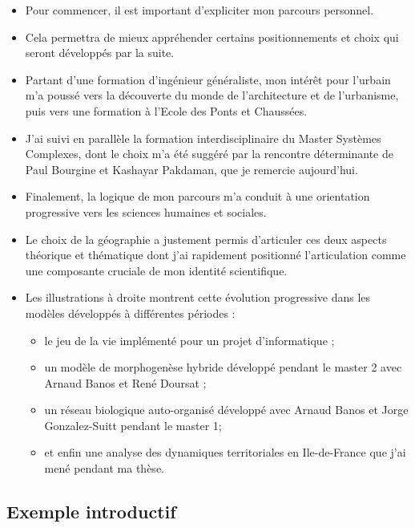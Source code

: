 \documentclass[12pt]{article}
\begin{document}
\begin{itemize}
	\item Pour commencer, il est important d'expliciter mon parcours personnel.
	\item Cela permettra de mieux appréhender certains positionnements et choix qui seront développés par la suite.
	\item Partant d'une formation d'ingénieur généraliste, mon intérêt pour l'urbain m'a poussé vers la découverte du monde de l'architecture et de l'urbanisme, puis vers une formation à l'Ecole des Ponts et Chaussées.
	\item J'ai suivi en parallèle la formation interdisciplinaire du Master Systèmes Complexes, dont le choix m'a été suggéré par la rencontre déterminante de Paul Bourgine et Kashayar Pakdaman, que je remercie aujourd'hui.
	\item Finalement, la logique de mon parcours m'a conduit à une orientation progressive vers les sciences humaines et sociales.
	\item Le choix de la géographie a justement permis d'articuler ces deux aspects théorique et thématique dont j'ai rapidement positionné l'articulation comme une composante cruciale de mon identité scientifique.
	\item Les illustrations à droite montrent cette évolution progressive dans les modèles développés à différentes périodes :
	\begin{itemize}
		\item le jeu de la vie implémenté pour un projet d'informatique ; 
		\item un modèle de morphogenèse hybride développé pendant le master 2 avec Arnaud Banos et René Doursat ;
		\item un réseau biologique auto-organisé développé avec Arnaud Banos et Jorge Gonzalez-Suitt pendant le master 1;
		\item et enfin une analyse des dynamiques territoriales en Ile-de-France que j'ai mené pendant ma thèse.
	\end{itemize}
\end{itemize}


\newpage



\subsection*{Exemple introductif}
\end{document}
